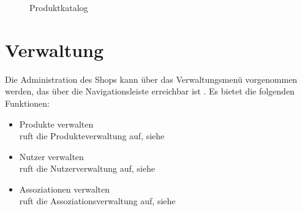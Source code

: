 \begin{figure}[h!]
  \centering
  \caption{Produktkatalog}
  \label{fig:Produktkatalog}
\end{figure}


\section{Verwaltung}
\label{sec:Verwaltung}
Die Administration des Shops kann über das Verwaltungsmenü vorgenommen werden, das über die Navigationsleiste erreichbar ist . Es bietet die folgenden Funktionen:
\begin{itemize}
  \item Produkte verwalten \\
        ruft die Produkteverwaltung auf, siehe 
  \vspace*{-0.5em}
  \item Nutzer verwalten \\
        ruft die Nutzerverwaltung auf, siehe 
  \vspace*{-0.5em}
  \item Assoziationen verwalten \\
        ruft die Assoziationsverwaltung auf, siehe 
  \vspace*{-0.5em}
\end{itemize}

